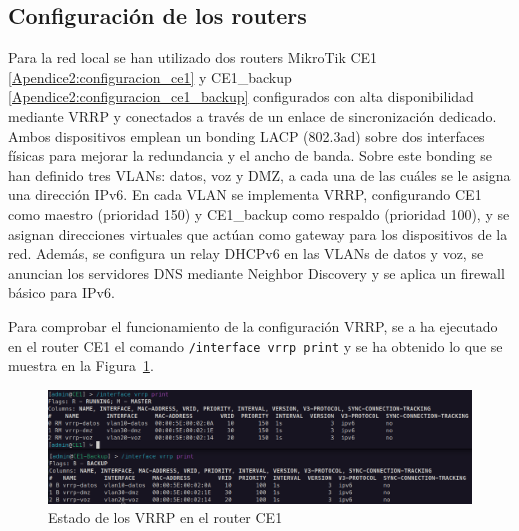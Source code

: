 \subsection{Configuración de los routers}
Para la red local se han utilizado dos routers MikroTik CE1 \ref{Apendice2:configuracion_ce1} y CE1\_backup \ref{Apendice2:configuracion_ce1_backup} configurados con alta disponibilidad mediante VRRP y conectados a través de un enlace de sincronización dedicado. Ambos dispositivos emplean un bonding LACP (802.3ad) sobre dos interfaces físicas para mejorar la redundancia y el ancho de banda. Sobre este bonding se han definido tres VLANs: datos, voz
y DMZ, a cada una de las cuáles se le asigna una dirección IPv6. En cada VLAN se implementa VRRP, configurando CE1 como maestro (prioridad 150) y CE1\_backup como respaldo (prioridad 100), y se asignan direcciones virtuales que actúan como gateway para los dispositivos de la red. Además, se configura un relay DHCPv6 en las VLANs de datos y voz, se anuncian los servidores DNS mediante Neighbor Discovery \cite{wikipedia_nd} y se aplica un firewall básico para IPv6.

\vspace{0.5cm}
Para comprobar el funcionamiento de la configuración VRRP, se a ha ejecutado en el router CE1 el comando \lstinline[language=RouterOS]|/interface vrrp print| y se ha obtenido lo que se muestra en la Figura~\ref{fig:vrrp_output_1}.

\begin{figure}[H]
	\centering
	\includegraphics[width=1\textwidth]{images/vrrp_output_1.png}
	\caption{Estado de los VRRP en el router CE1}
	\label{fig:vrrp_output_1}
\end{figure}

